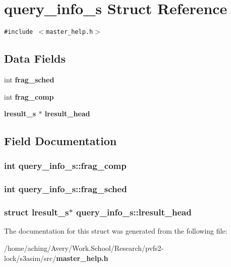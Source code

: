 \section{query\_\-info\_\-s Struct Reference}
\label{structquery__info__s}
{\tt \#include $<$master\_\-help.h$>$}

\subsection*{Data Fields}
\begin{CompactItemize}
\item 
int \bf{frag\_\-sched}
\item 
int \bf{frag\_\-comp}
\item 
\bf{lresult\_\-s} $\ast$ \bf{lresult\_\-head}
\end{CompactItemize}


\subsection{Field Documentation}
\subsubsection{\setlength{\rightskip}{0pt plus 5cm}int \bf{query\_\-info\_\-s::frag\_\-comp}}\label{structquery__info__s_01dd9d6f43a75c1cab5a4b27157cca4d}


\subsubsection{\setlength{\rightskip}{0pt plus 5cm}int \bf{query\_\-info\_\-s::frag\_\-sched}}\label{structquery__info__s_6d62bf12cb9b28a9d4c62692fa671801}


\subsubsection{\setlength{\rightskip}{0pt plus 5cm}struct \bf{lresult\_\-s}$\ast$ \bf{query\_\-info\_\-s::lresult\_\-head}}\label{structquery__info__s_17ea608183b689496ada207d696ffd62}




The documentation for this struct was generated from the following file:\begin{CompactItemize}
\item 
/home/aching/Avery/Work.School/Research/pvfs2-lock/s3asim/src/\bf{master\_\-help.h}\end{CompactItemize}
